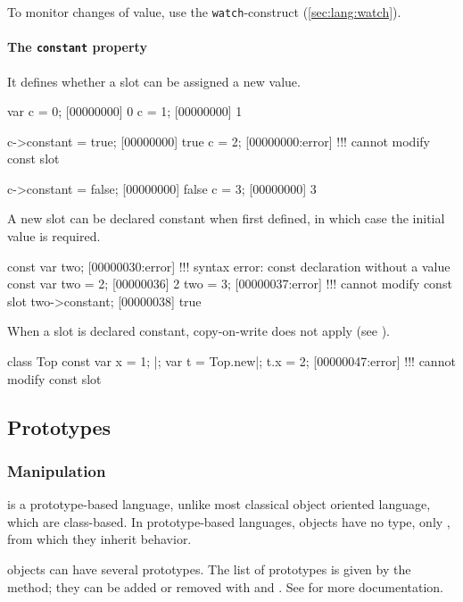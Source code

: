 To monitor changes of value, use the \lstinline{watch}-construct
(\autoref{sec:lang:watch}).



\paragraph{The \lstinline{constant} property}
It defines whether a slot can be assigned a new value.

\begin{urbiscript}
var c = 0;
[00000000] 0
c = 1;
[00000000] 1

c->constant = true;
[00000000] true
c = 2;
[00000000:error] !!! cannot modify const slot

c->constant = false;
[00000000] false
c = 3;
[00000000] 3
\end{urbiscript}

A new slot can be declared constant when first defined, in which case the
initial value is required.

\begin{urbiscript}
const var two;
[00000030:error] !!! syntax error: const declaration without a value
const var two = 2;
[00000036] 2
two = 3;
[00000037:error] !!! cannot modify const slot
two->constant;
[00000038] true
\end{urbiscript}

When a slot is declared constant, copy-on-write does not apply (see
).

\begin{urbiscript}
class Top
{
  const var x = 1;
}|;
var t = Top.new|;
t.x = 2;
[00000047:error] !!! cannot modify const slot
\end{urbiscript}



\subsection{Prototypes}

\subsubsection{Manipulation}

\us is a prototype-based language, unlike most classical object oriented
language, which are class-based. In prototype-based languages, objects have
no type, only , from which they inherit behavior.

\us objects can have several prototypes. The list of prototypes is given by
the  method; they can be added or removed with
 and .  See
 for more documentation.

